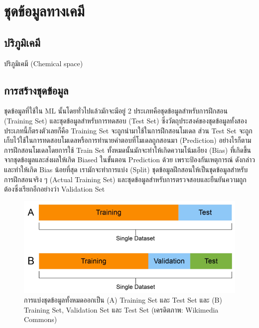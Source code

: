 

\chapter{ชุดข้อมูลทางเคมี}
\label{ch:dataset}

\section{ปริภูมิเคมี}
\label{sec:chem_space}

ปริภูมิเคมี (Chemical space)\autocite{kirkpatrick2004}

\section{การสร้างชุดข้อมูล}
\label{sec:create_dataset}

ชุดข้อมูลที่ใช้ใน ML นั้นโดยทั่วไปแล้วมักจะมีอยู่ 2 ประเภทคือชุดข้อมูลสำหรับการฝึกสอน (Training Set) และชุดข้อมูลสำหรับการทดสอบ 
(Test Set) ซึ่งวัตถุประสงค์ของชุดข้อมูลทั้งสองประเภทนี้ก็ตรงตัวเลยก็คือ Training Set จะถูกนำมาใช้ในการฝึกสอนโมเดล ส่วน Test Set 
จะถูกเก็บไว้ใช้ในการทดสอบโมเดลหรือการทำนายคำตอบที่โมเดลถูกสอนมา (Prediction) อย่างไรก็ตาม การฝึกสอนโมเดลโดยการใช้ Train Set 
ทั้งหมดนั้นมักจะทำให้เกิดความโน้มเอียง (Bias) ที่เกิดขึ้นจากชุดข้อมูลและส่งผลให้เกิด Biased ในขั้นตอน Prediction ด้วย เพราะป้องกันเหตุการณ์%
ดังกล่าวและทำให้เกิด Bias น้อยที่สุด เรามักจะทำการแบ่ง (Split) ชุดข้อมูลฝึกสอนให้เป็นชุดข้อมูลสำหรับการฝึกสอนจริง ๆ (Actual Training 
Set) และชุดข้อมูลสำหรับการตรวจสอบและยืนยันความถูกต้องซึ่งเรียกอีกอย่างว่า Validation Set

\begin{figure}[H]
    \centering
    \includegraphics[width=0.8\linewidth]{fig/dataset.png}
    \caption{การแบ่งชุดข้อมูลทั้งหมดออกเป็น (A) Training Set และ Test Set และ (B) Training Set, Validation Set และ 
    Test Set (เครดิตภาพ: Wikimedia Commons)}
    \label{fig:dataset}
\end{figure}

